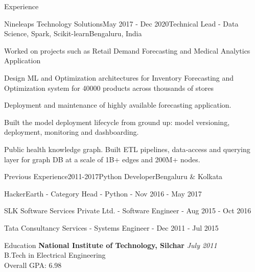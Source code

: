 \documentclass{resume}
\begin{document}
\begin{rSection}{Experience}
    \begin{rSubsection}{Nineleaps Technology Solutions}{May 2017 - Dec 2020}{Technical Lead - Data Science, Spark, Scikit-learn}{Bengaluru, India}
    \item Worked on projects such as Retail Demand Forecasting and Medical Analytics Application
    \item Design ML and Optimization architectures for Inventory Forecasting and Optimization system for 40000 products across thousands of stores
    \item Deployment and maintenance of highly available forecasting application.
    \item Built the model deployment lifecycle from ground up: model versioning, deployment, monitoring and dashboarding.
    \item Public health knowledge graph. Built ETL pipelines, data‐access and querying layer for graph DB at a scale of 1B+ edges and 200M+ nodes.
    \end{rSubsection}

    \begin{rSubsection}{Previous Experience}{2011-2017}{Python Developer}{Bengaluru \& Kolkata}
    \item HackerEarth - Category Head - Python - Nov 2016 - May 2017
    \item SLK Software Services Private Ltd. - Software Engineer - Aug 2015 - Oct 2016
    \item Tata Consultancy Services - Systems Engineer - Dec 2011 - Jul 2015
    \end{rSubsection}
  
  \end{rSection}
  
  \pagebreak
  
  \begin{rSection}{Education}
    {\bf National Institute of Technology, Silchar} \hfill {\em July 2011} \\ 
    { B.Tech in Electrical Engineering } \\
    Overall GPA: 6.98
  \end{rSection}
  
\end{document}
